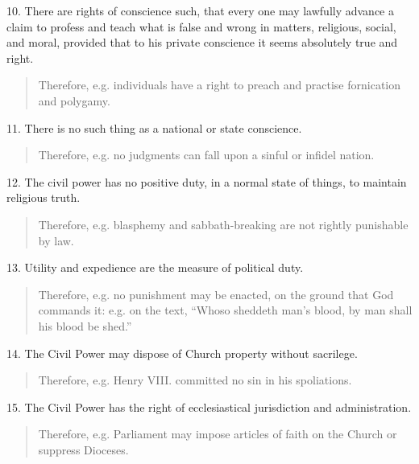10. There are rights of conscience such, that every one may lawfully
advance a claim to profess and teach what is false and wrong in matters,
religious, social, and moral, provided that to his private conscience it
seems absolutely true and right.

\begin{quote}

Therefore, e.g. individuals have a right to preach and practise
fornication and polygamy.

\end{quote}

11. There is no such thing as a national or state conscience.

\begin{quote}

Therefore, e.g. no judgments can fall upon a sinful or infidel
nation.
\end{quote}

12. The civil power has no positive duty, in a normal state of
things, to maintain religious truth.

\begin{quote}

Therefore, e.g. blasphemy and sabbath-breaking are not rightly
punishable by law.

\end{quote}

13. Utility and expedience are the measure of political duty.

\begin{quote}

Therefore, e.g. no punishment may be enacted, on the ground that
God commands it: e.g. on the text, ``Whoso sheddeth man's
blood, by man shall his blood be shed.''

\end{quote}

14. The Civil Power may dispose of Church property without sacrilege.

\begin{quote}

Therefore, e.g. Henry VIII. committed no sin in his spoliations.

\end{quote}

15. The Civil Power has the right of ecclesiastical jurisdiction and
administration.

\begin{quote}

Therefore, e.g. Parliament may impose articles of faith on the
Church or suppress Dioceses.

\end{quote}

